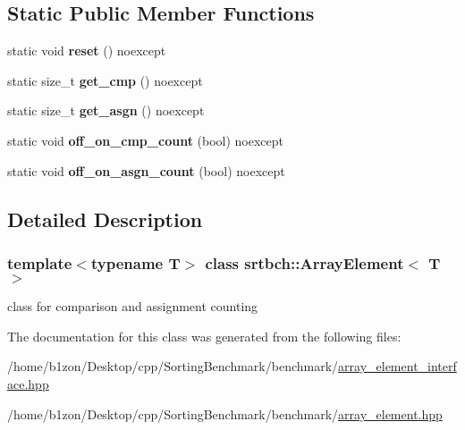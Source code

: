\subsection*{Static Public Member Functions}
\begin{DoxyCompactItemize}
\item 
\mbox{\label{classsrtbch_1_1ArrayElement_a56ddcb91e202d07abe90f6c6dc2d579e}} 
static void {\bfseries reset} () noexcept
\item 
\mbox{\label{classsrtbch_1_1ArrayElement_a550245e4b431ceb947af90e9894b9a98}} 
static size\+\_\+t {\bfseries get\+\_\+cmp} () noexcept
\item 
\mbox{\label{classsrtbch_1_1ArrayElement_aa5fbfd4b0215eb91e47fd472b95dadfc}} 
static size\+\_\+t {\bfseries get\+\_\+asgn} () noexcept
\item 
\mbox{\label{classsrtbch_1_1ArrayElement_a0cf3e08ba6239c023e21fc2b4b0b09a5}} 
static void {\bfseries off\+\_\+on\+\_\+cmp\+\_\+count} (bool) noexcept
\item 
\mbox{\label{classsrtbch_1_1ArrayElement_a518b11bcab7b14ea3d708d24a13742c4}} 
static void {\bfseries off\+\_\+on\+\_\+asgn\+\_\+count} (bool) noexcept
\end{DoxyCompactItemize}


\subsection{Detailed Description}
\subsubsection*{template$<$typename T$>$\newline
class srtbch\+::\+Array\+Element$<$ T $>$}

class for comparison and assignment counting 

The documentation for this class was generated from the following files\+:\begin{DoxyCompactItemize}
\item 
/home/b1zon/\+Desktop/cpp/\+Sorting\+Benchmark/benchmark/\hyperlink{array__element__interface_8hpp}{array\+\_\+element\+\_\+interface.\+hpp}\item 
/home/b1zon/\+Desktop/cpp/\+Sorting\+Benchmark/benchmark/\hyperlink{array__element_8hpp}{array\+\_\+element.\+hpp}\end{DoxyCompactItemize}
